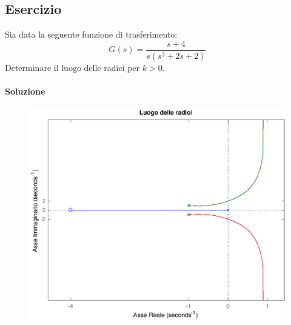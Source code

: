 \subsection{Esercizio}
Sia data la seguente funzione di trasferimento:
\[
	G(s) = \frac{s+4}{s(s^2+2s+2)}
\]
Determinare il luogo delle radici per \(k>0\).

\paragraph{Soluzione}

\begin{figure}[ht]
	\centering
	\includegraphics[scale=.6]{mod1/assets/rl_ex312}
\end{figure}

